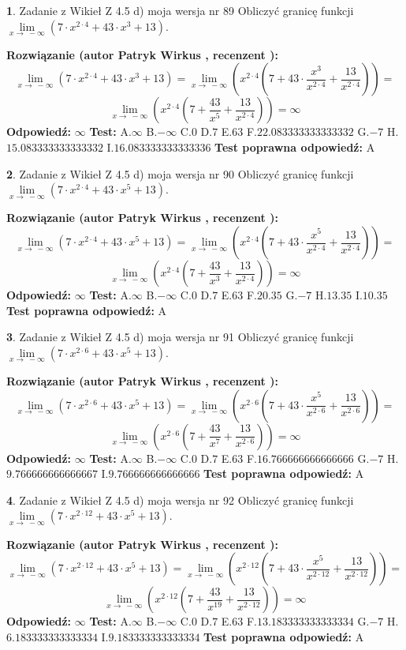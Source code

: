 \documentclass[12pt, a4paper]{article}
\theoremstyle{definition} %
\newtheorem{zad}{}
\newcommand{\zadStart}[1]{\begin{zad}#1\newline}
\newcommand{\zadStop}{\end{zad}}
\newcommand{\rozwStart}[2]{\noindent \textbf{Rozwiązanie (autor #1 , recenzent #2): }\newline}
\newcommand{\rozwStop}{\newline}
\newcommand{\odpStart}{\noindent \textbf{Odpowiedź:}\newline}
\newcommand{\odpStop}{\newline}
\newcommand{\testStart}{\noindent \textbf{Test:}\newline}
\newcommand{\testStop}{\newline}
\newcommand{\kluczStart}{\noindent \textbf{Test poprawna odpowiedź:}\newline}
\newcommand{\kluczStop}{\newline}
\begin{document}
\zadStart{Zadanie z Wikieł Z 4.5 d) moja wersja nr 89}
Obliczyć granicę funkcji  $\lim\limits_{x\to\ -\infty}(7 \cdot x^{2\cdot4}+43 \cdot x^{3}+13)$.
\zadStop
\rozwStart{Patryk Wirkus}{}
$$\lim\limits_{x\to\ -\infty}(7 \cdot x^{2\cdot4}+43 \cdot x^{3}+13) = \lim\limits_{x\to\ -\infty}(x^{2\cdot4}(7 +43 \cdot \frac{x^{3}}{x^{2\cdot4}}+\frac{13}{x^{2\cdot4}})) =$$ $$\lim\limits_{x\to\ -\infty}(x^{2\cdot4}(7 +\frac{43}{x^{5}}+\frac{13}{x^{2\cdot4}})) =\infty$$
\rozwStop
\odpStart
$\infty$
\odpStop
\testStart
A.$\infty$ B.$-\infty$ C.$0$ D.$7$ E.$63$
F.$22.083333333333332$ G.$-7$
H.$15.083333333333332$
I.$16.083333333333336$
\testStop
\kluczStart
A
\kluczStop



\zadStart{Zadanie z Wikieł Z 4.5 d) moja wersja nr 90}
Obliczyć granicę funkcji  $\lim\limits_{x\to\ -\infty}(7 \cdot x^{2\cdot4}+43 \cdot x^{5}+13)$.
\zadStop
\rozwStart{Patryk Wirkus}{}
$$\lim\limits_{x\to\ -\infty}(7 \cdot x^{2\cdot4}+43 \cdot x^{5}+13) = \lim\limits_{x\to\ -\infty}(x^{2\cdot4}(7 +43 \cdot \frac{x^{5}}{x^{2\cdot4}}+\frac{13}{x^{2\cdot4}})) =$$ $$\lim\limits_{x\to\ -\infty}(x^{2\cdot4}(7 +\frac{43}{x^{3}}+\frac{13}{x^{2\cdot4}})) =\infty$$
\rozwStop
\odpStart
$\infty$
\odpStop
\testStart
A.$\infty$ B.$-\infty$ C.$0$ D.$7$ E.$63$
F.$20.35$ G.$-7$
H.$13.35$
I.$10.35$
\testStop
\kluczStart
A
\kluczStop



\zadStart{Zadanie z Wikieł Z 4.5 d) moja wersja nr 91}
Obliczyć granicę funkcji  $\lim\limits_{x\to\ -\infty}(7 \cdot x^{2\cdot6}+43 \cdot x^{5}+13)$.
\zadStop
\rozwStart{Patryk Wirkus}{}
$$\lim\limits_{x\to\ -\infty}(7 \cdot x^{2\cdot6}+43 \cdot x^{5}+13) = \lim\limits_{x\to\ -\infty}(x^{2\cdot6}(7 +43 \cdot \frac{x^{5}}{x^{2\cdot6}}+\frac{13}{x^{2\cdot6}})) =$$ $$\lim\limits_{x\to\ -\infty}(x^{2\cdot6}(7 +\frac{43}{x^{7}}+\frac{13}{x^{2\cdot6}})) =\infty$$
\rozwStop
\odpStart
$\infty$
\odpStop
\testStart
A.$\infty$ B.$-\infty$ C.$0$ D.$7$ E.$63$
F.$16.766666666666666$ G.$-7$
H.$9.766666666666667$
I.$9.766666666666666$
\testStop
\kluczStart
A
\kluczStop



\zadStart{Zadanie z Wikieł Z 4.5 d) moja wersja nr 92}
Obliczyć granicę funkcji  $\lim\limits_{x\to\ -\infty}(7 \cdot x^{2\cdot12}+43 \cdot x^{5}+13)$.
\zadStop
\rozwStart{Patryk Wirkus}{}
$$\lim\limits_{x\to\ -\infty}(7 \cdot x^{2\cdot12}+43 \cdot x^{5}+13) = \lim\limits_{x\to\ -\infty}(x^{2\cdot12}(7 +43 \cdot \frac{x^{5}}{x^{2\cdot12}}+\frac{13}{x^{2\cdot12}})) =$$ $$\lim\limits_{x\to\ -\infty}(x^{2\cdot12}(7 +\frac{43}{x^{19}}+\frac{13}{x^{2\cdot12}})) =\infty$$
\rozwStop
\odpStart
$\infty$
\odpStop
\testStart
A.$\infty$ B.$-\infty$ C.$0$ D.$7$ E.$63$
F.$13.183333333333334$ G.$-7$
H.$6.183333333333334$
I.$9.183333333333334$
\testStop
\kluczStart
A
\kluczStop
\end{document}
